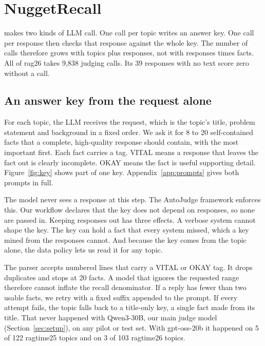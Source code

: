\section{NuggetRecall}
\label{sec:nuggetrecall}

 makes two kinds of LLM call. One call per topic writes an
answer key. One call per response then checks that response against the whole key.
The number of calls therefore grows with topics plus responses, not with responses
times facts. All of rag26 takes 9,838 judging calls. Its 39 responses with no text
score zero without a call.

\subsection{An answer key from the request alone}

For each topic, the LLM receives the request, which is the topic's title, problem
statement and background in a fixed order. We ask it for 8 to 20
self-contained facts that a complete, high-quality response should contain, with
the most important first. Each fact carries a tag. VITAL means a response that
leaves the fact out is clearly incomplete. OKAY means the fact is useful
supporting detail. Figure~\ref{fig:key} shows part of one key.
Appendix~\ref{app:prompts} gives both prompts in full.

The model never sees a response at this step. The AutoJudge framework enforces
this. Our workflow declares that the key does not depend on responses, so none are
passed in. Keeping responses out has three effects. A verbose system cannot shape
the key. The key can hold a fact that every system missed, which a key mined from
the responses cannot. And because the key comes from the topic alone, the data
policy lets us read it for any topic.

The parser accepts numbered lines that carry a VITAL or OKAY tag. It drops
duplicates and stops at 20 facts. A model that ignores the requested range
therefore cannot inflate the recall denominator. If a reply has fewer than two
usable facts, we retry with a fixed suffix appended to the prompt. If every attempt
fails, the topic falls back to a title-only key, a single fact made from its title. That never
happened with Qwen3-30B, our main judge model (Section~\ref{sec:setup}), on any pilot or test set. With gpt-oss-20b it happened on 5
of 122 ragtime25 topics and on 3 of 103 ragtime26 topics.

